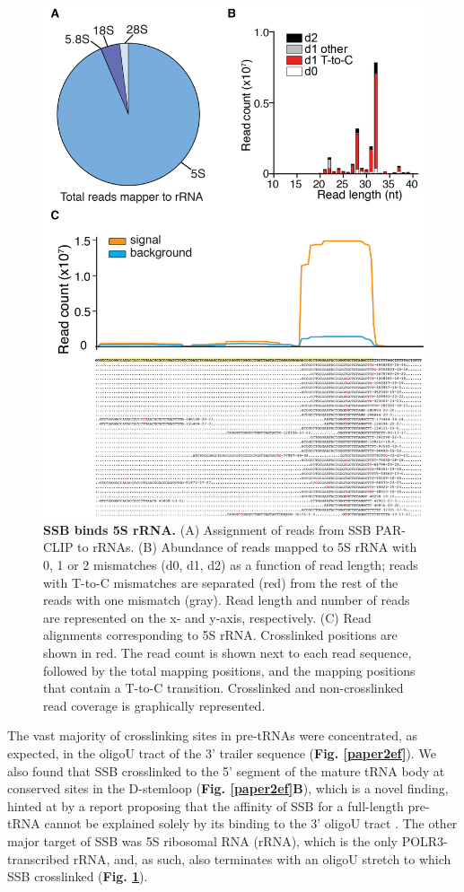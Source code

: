 \documentclass[12pt]{rockefeller}
\begin{document}
\begin{figure}[!h]%
\centering
\includegraphics[scale = 0.8]{supp3.png}%
\caption[SSB binds 5S rRNA.]
{
\textbf{SSB binds 5S rRNA.}
(A) Assignment of reads from SSB PAR-CLIP to rRNAs. (B) Abundance of reads mapped to 5S rRNA with 0, 1 or 2 mismatches (d0, d1, d2) as a function of read length; reads with T-to-C mismatches are separated (red) from the rest of the reads with one mismatch (gray). Read length and number of reads are represented on the x- and y-axis, respectively. (C) Read alignments corresponding to 5S rRNA. Crosslinked positions are shown in red. The read count is shown next to each read sequence, followed by the total mapping positions, and the mapping positions that contain a T-to-C transition. Crosslinked and non-crosslinked read coverage is graphically represented.
}
\centering
\label{supp3}%
\end{figure}

The vast majority of crosslinking sites in pre-tRNAs were concentrated, as expected, in the oligoU tract of the 3’ trailer sequence (\textbf{Fig. \ref{paper2ef}}). We also found that SSB crosslinked to the 5’ segment of the mature tRNA body at conserved sites in the D-stemloop (\textbf{Fig. \ref{paper2ef}B}), which is a novel finding, hinted at by a report proposing that the affinity of SSB for a full-length pre-tRNA cannot be explained solely by its binding to the 3’ oligoU tract \cite{Bayfield:2009cx}. The other major target of SSB was 5S ribosomal RNA (rRNA), which is the only POLR3-transcribed rRNA, and, as such,	 also terminates with an oligoU stretch to which SSB crosslinked (\textbf{Fig. \ref{supp3}}). 
\end{document}
